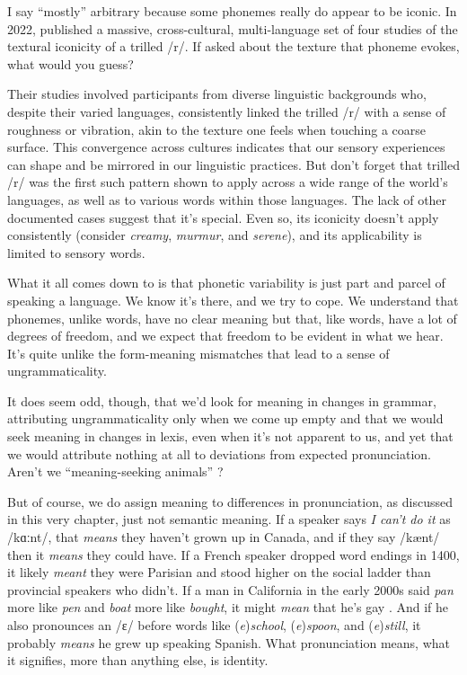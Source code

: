 I say \enquote{mostly} arbitrary because some phonemes really do appear to be iconic. In 2022, \citet{Winter2022} published a massive, cross-cultural, multi-language set of four studies of the textural iconicity of a trilled /r/. If asked about the texture that phoneme evokes, what would you guess?

Their studies involved participants from diverse linguistic backgrounds who, despite their varied languages, consistently linked the trilled /r/ with a sense of roughness or vibration, akin to the texture one feels when touching a coarse surface.  This convergence across cultures indicates that our sensory experiences can shape and be mirrored in our linguistic practices. But don't forget that trilled /r/ was the first such pattern shown to apply across a wide range of the world's languages, as well as to various words within those languages. The lack of other documented cases suggest that it's special. Even so, its iconicity doesn't apply consistently (consider \textit{creamy}, \textit{murmur}, and \textit{serene}), and its applicability is limited to sensory words.


What it all comes down to is that phonetic variability is just part and parcel of speaking a language. We know it's there, and we try to cope. We understand that phonemes, unlike words, have no clear meaning but that, like words, have a lot of degrees of freedom, and we expect that freedom to be evident in what we hear. It's quite unlike the form-meaning mismatches that lead to a sense of ungrammaticality.

\bigskip

It does seem odd, though, that we'd look for meaning in changes in grammar, attributing ungrammaticality only when we come up empty and that we would seek meaning in changes in lexis, even when it's not apparent to us, and yet that we would attribute nothing at all to deviations from expected pronunciation. Aren't we \enquote{meaning-seeking animals} \citep[636]{Geertz2016}?

But of course, we do assign meaning to differences in pronunciation, as discussed in this very chapter, just not semantic meaning. If a speaker says \textit{I can't do it} as /kɑːnt/, that \textit{means} they haven't grown up in Canada, and if they say /kænt/ then it \textit{means} they could have. If a French speaker dropped word endings in 1400, it likely \textit{meant} they were Parisian and stood higher on the social ladder than provincial speakers who didn't. If a man in California in the early 2000s said \textit{pan} more like \textit{pen} and \textit{boat} more like \textit{bought}, it might \textit{mean} that he's gay \citep{Podesva2011}. And if he also pronounces an /ɛ/ before words like (\textit{e})\textit{school}, (\textit{e})\textit{spoon}, and (\textit{e})\textit{still}, it probably \textit{means} he grew up speaking Spanish. What pronunciation means, what it signifies, more than anything else, is identity.

